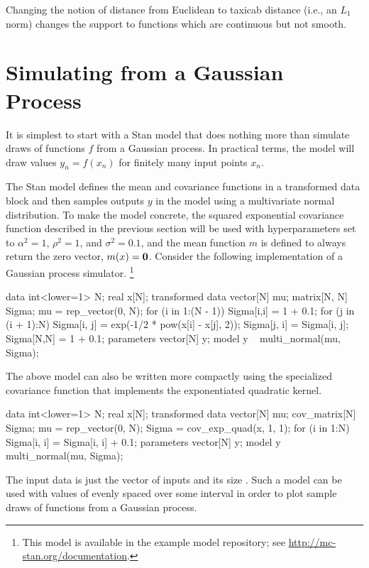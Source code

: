 Changing the notion of distance from Euclidean to taxicab distance
(i.e., an $L_1$ norm) changes the support to functions which are
continuous but not smooth.

\section{Simulating from a Gaussian Process}

It is simplest to start with a Stan model that does nothing more than
simulate draws of functions $f$ from a Gaussian process.  In practical
terms, the model will draw values $y_n = f(x_n)$ for finitely many
input points $x_n$.

The Stan model defines the mean and covariance functions in a
transformed data block and then samples outputs $y$ in the model using
a multivariate normal distribution.  To make the model concrete, the
squared exponential covariance function described in the previous section
will be used with hyperparameters set to $\alpha^2 = 1$, $\rho^2 = 1$,
and $\sigma^2 = 0.1$, and the mean function $m$ is defined to always
return the zero vector, $m(x) = {\bf 0}$.  Consider the following
implementation of a Gaussian process simulator.%
%
\footnote{This model is available in the example model repository;
  see \url{http://mc-stan.org/documentation}.}
%
\begin{stancode}
data {
  int<lower=1> N;
  real x[N];
}
transformed data {
  vector[N] mu;
  matrix[N, N] Sigma;
  mu = rep_vector(0, N);
  for (i in 1:(N - 1)) {
    Sigma[i,i] = 1 + 0.1;
    for (j in (i + 1):N) {
      Sigma[i, j] = exp(-1/2 * pow(x[i] - x[j], 2));
      Sigma[j, i] = Sigma[i, j];
    }
  }
  Sigma[N,N] = 1 + 0.1;
}
parameters {
  vector[N] y;
}
model {
  y ~ multi_normal(mu, Sigma);
}
\end{stancode}
%
The above model can also be written more compactly using the specialized
covariance function that implements the exponentiated quadratic kernel. 
%
\begin{stancode}
data {
  int<lower=1> N;
  real x[N];
}
transformed data {
  vector[N] mu;
  cov_matrix[N] Sigma;
  mu = rep_vector(0, N);
  Sigma = cov_exp_quad(x, 1, 1);
  for (i in 1:N)
    Sigma[i, i] = Sigma[i, i] + 0.1;
}
parameters {
  vector[N] y;
}
model {
  y ~ multi_normal(mu, Sigma);
}
\end{stancode}
%
The input data is just the vector of inputs  and its size
.  Such a model can be used with values of  evenly
spaced over some interval in order to plot sample draws of functions
from a Gaussian process.  

